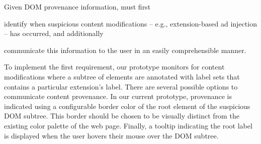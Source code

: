 Given DOM provenance information, \origintracer must first
\begin{inparaenum}
    \item identify when suspicious content modifications -- e.g.,
    extension-based ad injection -- has occurred, and additionally
    \item communicate this information to the user in an easily comprehensible
    manner.
\end{inparaenum}

To implement the first requirement, our prototype monitors for content
modifications where a subtree of elements are annotated with label sets that
contains a particular extension's label. There are several possible options to
communicate content provenance. In our current prototype, provenance is
indicated using a configurable border color of the root element of the
suspicious DOM subtree. This border should be chosen to be visually distinct
from the existing color palette of the web page. Finally, a tooltip indicating
the root label is displayed when the user hovers their mouse over the DOM
subtree.
